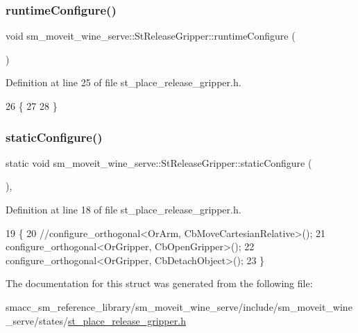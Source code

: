 \subsubsection{\texorpdfstring{runtime\+Configure()}{runtimeConfigure()}}
{\footnotesize\ttfamily void sm\+\_\+moveit\+\_\+wine\+\_\+serve\+::\+St\+Release\+Gripper\+::runtime\+Configure (\begin{DoxyParamCaption}{ }\end{DoxyParamCaption})\hspace{0.3cm}{\ttfamily [inline]}}



Definition at line 25 of file st\+\_\+place\+\_\+release\+\_\+gripper.\+h.


\begin{DoxyCode}
26         \{
27           
28         \}
\end{DoxyCode}
\mbox{\label{structsm__moveit__wine__serve_1_1StReleaseGripper_aeecac1480c4f0ccbff0a327012c9fb57}} 
\subsubsection{\texorpdfstring{static\+Configure()}{staticConfigure()}}
{\footnotesize\ttfamily static void sm\+\_\+moveit\+\_\+wine\+\_\+serve\+::\+St\+Release\+Gripper\+::static\+Configure (\begin{DoxyParamCaption}{ }\end{DoxyParamCaption})\hspace{0.3cm}{\ttfamily [inline]}, {\ttfamily [static]}}



Definition at line 18 of file st\+\_\+place\+\_\+release\+\_\+gripper.\+h.


\begin{DoxyCode}
19         \{
20             \textcolor{comment}{//configure\_orthogonal<OrArm, CbMoveCartesianRelative>();}
21             configure\_orthogonal<OrGripper, CbOpenGripper>();
22             configure\_orthogonal<OrGripper, CbDetachObject>();
23         \}
\end{DoxyCode}


The documentation for this struct was generated from the following file\+:\begin{DoxyCompactItemize}
\item 
smacc\+\_\+sm\+\_\+reference\+\_\+library/sm\+\_\+moveit\+\_\+wine\+\_\+serve/include/sm\+\_\+moveit\+\_\+wine\+\_\+serve/states/\hyperlink{st__place__release__gripper_8h}{st\+\_\+place\+\_\+release\+\_\+gripper.\+h}\end{DoxyCompactItemize}
